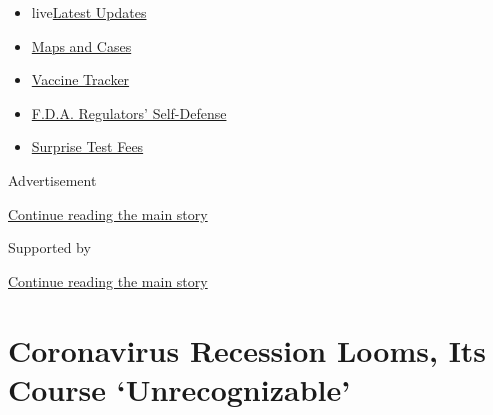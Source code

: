 \begin{itemize}
\tightlist
\item
  live\href{https://www.nytimes3xbfgragh.onion/2020/09/11/world/covid-19-coronavirus.html?name=styln-coronavirus-markets\&region=TOP_BANNER\&block=storyline_menu_recirc\&action=click\&pgtype=Article\&impression_id=3e72a071-f4bc-11ea-b75e-3f4305a6ad65\&variant=undefined}{Latest
  Updates}
\item
  \href{https://www.nytimes3xbfgragh.onion/interactive/2020/us/coronavirus-us-cases.html?name=styln-coronavirus-markets\&region=TOP_BANNER\&block=storyline_menu_recirc\&action=click\&pgtype=Article\&impression_id=3e72c780-f4bc-11ea-b75e-3f4305a6ad65\&variant=undefined}{Maps
  and Cases}
\item
  \href{https://www.nytimes3xbfgragh.onion/interactive/2020/science/coronavirus-vaccine-tracker.html?name=styln-coronavirus-markets\&region=TOP_BANNER\&block=storyline_menu_recirc\&action=click\&pgtype=Article\&impression_id=3e72c781-f4bc-11ea-b75e-3f4305a6ad65\&variant=undefined}{Vaccine
  Tracker}
\item
  \href{https://www.nytimes3xbfgragh.onion/2020/09/10/us/politics/fda-coronavirus-vaccine.html?name=styln-coronavirus-markets\&region=TOP_BANNER\&block=storyline_menu_recirc\&action=click\&pgtype=Article\&impression_id=3e72c782-f4bc-11ea-b75e-3f4305a6ad65\&variant=undefined}{F.D.A.
  Regulators' Self-Defense}
\item
  \href{https://www.nytimes3xbfgragh.onion/2020/09/09/upshot/coronavirus-surprise-test-fees.html?name=styln-coronavirus-markets\&region=TOP_BANNER\&block=storyline_menu_recirc\&action=click\&pgtype=Article\&impression_id=3e72c783-f4bc-11ea-b75e-3f4305a6ad65\&variant=undefined}{Surprise
  Test Fees}
\end{itemize}

Advertisement

\protect\hyperlink{after-top}{Continue reading the main story}

Supported by

\protect\hyperlink{after-sponsor}{Continue reading the main story}

\hypertarget{coronavirus-recession-looms-its-course-unrecognizable}{%
\section{Coronavirus Recession Looms, Its Course
`Unrecognizable'}\label{coronavirus-recession-looms-its-course-unrecognizable}}

